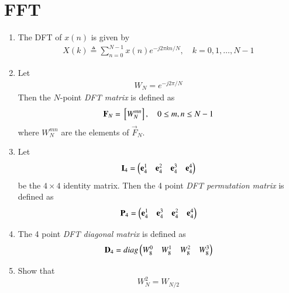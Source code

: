\documentclass[journal,12pt,twocolumn]{IEEEtran}
\renewcommand\thesection{\arabic{section}}
\begin{document}
\section{FFT}
\begin{enumerate}[label=\arabic*.,ref=\thesection.\theenumi]
	\item The DFT of $x(n)$ is given by
	\begin{align}
		X(k) \triangleq \sum_{n=0}^{N-1} x(n) e^{-j 2 \pi k n / N}, \quad k=0,1, \ldots, N-1
	\end{align}
	\item Let 
	\begin{align}
		W_{N} = e^{-j2\pi/N} 
	\end{align}
	Then the $N$-point {\em DFT matrix} is defined as 
	\begin{align}
		\mathbf{F}_{N} = {}\left[W_{N}^{mn}\right], \quad 0 \le m,n \le N-1 
	\end{align}
	where $W_{N}^{mn}$ are the elements of $\vec{F}_{N}$.
	\item Let 
	\begin{align}
		\mathbf{I}_4 = \begin{pmatrix}\mathbf{e}_4^{1} &\mathbf{e}_4^{2} &\mathbf{e}_4^{3} &\mathbf{e}_4^{4} \end{pmatrix}
	\end{align}
	be the $4\times 4$ identity matrix.  Then the 4 point {\em DFT permutation matrix} is defined as 
	\begin{align}
		\mathbf{P}_4 = \begin{pmatrix}\mathbf{e}_4^{1} &\mathbf{e}_4^{3} &\mathbf{e}_4^{2} &\mathbf{e}_4^{4} \end{pmatrix}
	\end{align}
	\item The 4 point {\em DFT diagonal matrix} is defined as 
	\begin{align}
		\mathbf{D}_4 = diag\begin{pmatrix}W_{8}^{0} & W_{8}^{1} & W_{8}^{2} & W_{8}^{3}\end{pmatrix}
	\end{align}
	\item Show that 
	\begin{equation}
		W_{N}^{2}=W_{N/2}
	\end{equation}



\end{enumerate}
\end{document}
